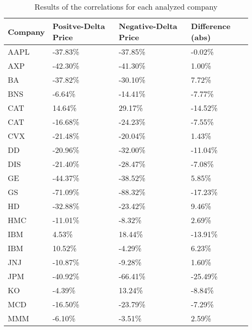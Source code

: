 \begin{table}\centering
	\caption{Results of the correlations for each analyzed company}\label{tab:GeneralResults}
   	\begin{tabular}{ | p{2cm\textwidth} | p{3.5cm\textwidth} | p{3.5cm\textwidth} | p{3.5cm\textwidth} | }
   	\hline
\textbf{Company} & \textbf{Positve-Delta Price} & \textbf{Negative-Delta Price} & \textbf{Difference (abs)}  \\\hline
AAPL    & -37.83\%           & -37.85\%            & -0.02\%  \\\hline
AXP     & -42.30\%           & -41.30\%            & 1.00\%   \\\hline
BA      & -37.82\%           & -30.10\%            & 7.72\%   \\\hline
BNS     & -6.64\%            & -14.41\%            & -7.77\%  \\\hline
CAT     & 14.64\%            & 29.17\%             & -14.52\% \\\hline
CAT     & -16.68\%           & -24.23\%            & -7.55\%  \\\hline
CVX     & -21.48\%           & -20.04\%            & 1.43\%   \\\hline
DD      & -20.96\%           & -32.00\%            & -11.04\% \\\hline
DIS     & -21.40\%           & -28.47\%            & -7.08\%  \\\hline
GE      & -44.37\%           & -38.52\%            & 5.85\%   \\\hline
GS      & -71.09\%           & -88.32\%            & -17.23\% \\\hline
HD      & -32.88\%           & -23.42\%            & 9.46\%   \\\hline
HMC     & -11.01\%           & -8.32\%             & 2.69\%   \\\hline
IBM     & 4.53\%             & 18.44\%             & -13.91\% \\\hline
IBM     & 10.52\%            & -4.29\%             & 6.23\%   \\\hline
JNJ     & -10.87\%           & -9.28\%             & 1.60\%   \\\hline
JPM     & -40.92\%           & -66.41\%            & -25.49\% \\\hline
KO      & -4.39\%            & 13.24\%             & -8.84\%  \\\hline
MCD     & -16.50\%           & -23.79\%            & -7.29\%  \\\hline
MMM     & -6.10\%            & -3.51\%             & 2.59\%   \\\hline

\end{tabular}
\end{table}
